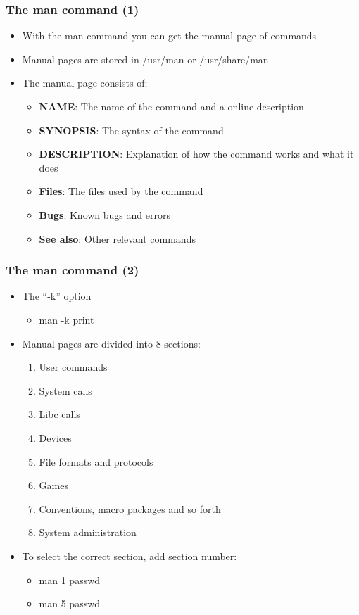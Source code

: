 \documentclass[red]{beamer}
\begin{document}
\begin{CJK*}{GBK}{kai}
\begin{frame}
\frametitle{The man command (1)}
\begin{itemize}
    \item With the man command you can get the manual page of commands
    \item Manual pages are stored in /usr/man or /usr/share/man
    \item The manual page consists of:
    \begin{itemize}
        \item \textbf{NAME}: The name of the command and a online description
        \item \textbf{SYNOPSIS}: The syntax of the command
        \item \textbf{DESCRIPTION}: Explanation of how the command works and what it does
        \item \textbf{Files}: The files used by the command
        \item \textbf{Bugs}: Known bugs and errors
        \item \textbf{See also}: Other relevant commands
    \end{itemize}
\end{itemize}
\end{frame}

\begin{frame}
\frametitle{The man command (2)}
\begin{itemize}
    \item The ``-k'' option
    \begin{itemize}
        \item man -k print
    \end{itemize}
    \item Manual pages are divided into 8 sections:
    \begin{enumerate}
        \item User commands
        \item System calls
        \item Libc calls
        \item Devices
        \item File formats and protocols
        \item Games
        \item Conventions, macro packages and so forth
        \item System administration
    \end{enumerate}
    \item To select the correct section, add section number:
    \begin{itemize}
        \item man 1 passwd
        \item man 5 passwd
    \end{itemize}
\end{itemize}
\end{frame}


\end{CJK*}
\end{document}

